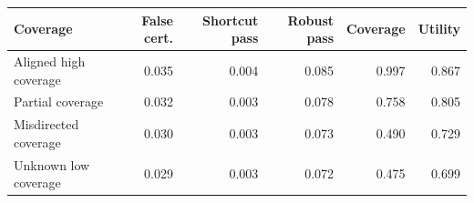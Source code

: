 \begin{tabular}{lrrrrr}
\toprule
Coverage & False cert. & Shortcut pass & Robust pass & Coverage & Utility \\
\midrule
Aligned high coverage & 0.035 & 0.004 & 0.085 & 0.997 & 0.867 \\
Partial coverage & 0.032 & 0.003 & 0.078 & 0.758 & 0.805 \\
Misdirected coverage & 0.030 & 0.003 & 0.073 & 0.490 & 0.729 \\
Unknown low coverage & 0.029 & 0.003 & 0.072 & 0.475 & 0.699 \\
\bottomrule
\end{tabular}
